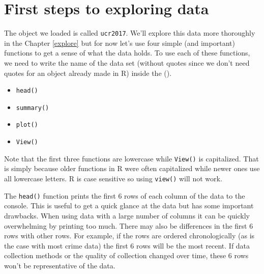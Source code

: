 \documentclass[
]{krantz}
\providecommand{\tightlist}{%
  \setlength{\itemsep}{0pt}\setlength{\parskip}{0pt}}
\begin{document}
\hypertarget{first-steps-to-exploring-data}{%
\section{First steps to exploring
data}\label{first-steps-to-exploring-data}}

The object we loaded is called \texttt{ucr2017}. We'll
explore this data more thoroughly in the Chapter
\ref{explore} but for now let's use four simple (and
important) functions to get a sense of what the data holds.
To use each of these functions, we need to write the name of
the data set (without quotes since we don't need quotes for
an object already made in R) inside the ().

\begin{itemize}
\tightlist
\item
  \texttt{head()}
\item
  \texttt{summary()}
\item
  \texttt{plot()}
\item
  \texttt{View()}
\end{itemize}

Note that the first three functions are lowercase while
\texttt{View()} is capitalized. That is simply because older
functions in R were often capitalized while newer ones use
all lowercase letters. R is case sensitive so using
\texttt{view()} will not work.

The \texttt{head()} function prints the first 6 rows of each
column of the data to the console. This is useful to get a
quick glance at the data but has some important drawbacks.
When using data with a large number of columns it can be
quickly overwhelming by printing too much. There may also be
differences in the first 6 rows with other rows. For
example, if the rows are ordered chronologically (as is the
case with most crime data) the first 6 rows will be the most
recent. If data collection methods or the quality of
collection changed over time, these 6 rows won't be
representative of the data.
\end{document}
